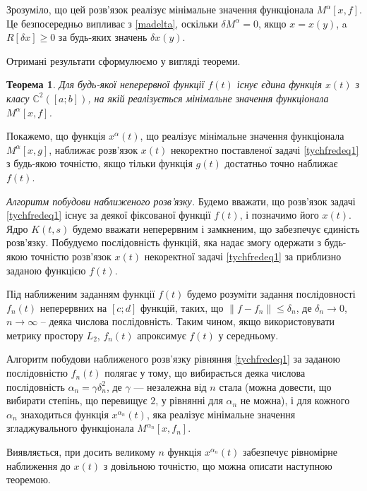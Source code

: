\documentclass[14pt,twoside]{extreport}
\theoremstyle{mystyle}
\newtheorem{thm}{Теорема}
\numberwithin{equation}{chapter}
\begin{document}
Зрозуміло, що цей розв'язок реалізує мінімальне значення функціонала $M^{\alpha}[x, f]$. Це безпосередньо випливає з \eqref{madelta}, оскільки $\delta M^{\alpha}=0$, якщо $x=x(y)$, a $R[\delta x] \geqslant 0$ за будь-яких значень $\delta x(y)$.

Отримані результати сформулюємо у вигляді теореми.

\begin{thm}
 Для будь-якої неперервної функції $f(t)$ існує єдина функція $x(t)$ з класу $\mathbb{C}^2([a; b])$, на якій реалізується мінімальне значення функціонала $M^{\alpha}[x, f]$.
\end{thm}

Покажемо, що функція $x^{\alpha}(t)$, що реалізує мінімальне значення функціонала $M^{\alpha}[x, g]$, наближає розв'язок $x(t)$ некоректно поставленої задачі \eqref{tychfredeq1} з будь-якою точністю, якщо тільки функція $g(t)$ достатньо точно наближає $f(t)$.

\emph{Алгоритм побудови наближеного розв'язку.} Будемо вважати, що розв'язок задачі \eqref{tychfredeq1} існує за деякої фіксованої функції $f(t)$, і позначимо його $x(t)$. Ядро $K(t, s)$ будемо вважати неперервним і замкненим, що забезпечує єдиність розв'язку. Побудуємо послідовність функцій, яка надає змогу одержати з будь-якою точністю розв'язок $x(t)$ некоректної задачі \eqref{tychfredeq1} за приблизно заданою функцією $f(t)$.

Під наближеним заданням функції $f(t)$ будемо розуміти задання послідовності $f_n(t)$ неперервних на $[c; d]$ функцій, таких, що $\|f-f_n\| \leqslant \delta_n$, де $\delta_n \to 0$, $n\to \infty$ -- деяка числова послідовність. Таким чином, якщо використовувати метрику простору $L_2$, $f_n(t)$ апроксимує $f(t)$ у середньому.
	
Алгоритм побудови наближеного розв'язку рівняння \eqref{tychfredeq1} за заданою послідовністю $f_n(t)$ полягає у тому, що вибирається деяка числова послідовність $\alpha_n = \gamma \delta_n^2$, де $\gamma$ — незалежна від $n$ стала (можна довести, що вибирати степінь, що перевищує $2$, у рівнянні для $\alpha_n$ не можна), і для кожного $\alpha_n$ знаходиться функція $x^{\alpha_n}(t)$, яка реалізує мінімальне значення згладжувального функціонала $M^{\alpha_n}[x, f_n]$.

Виявляється, при досить великому $n$ функція $x^{\alpha_n}(t)$ забезпечує рівномірне наближення до $x(t)$ з довільною точністю, що можна описати наступною теоремою.
\end{document}
